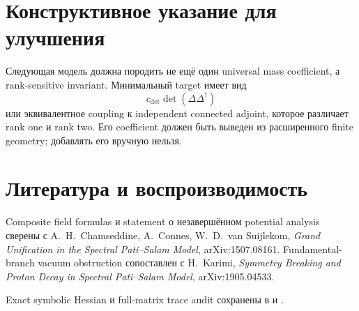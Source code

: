 \section{Конструктивное указание для улучшения}

Следующая модель должна породить не ещё один universal mass coefficient, а
rank-sensitive invariant. Минимальный target имеет вид
\begin{equation}
 c_{\det}\det(\Delta\Delta^\dagger)
\end{equation}
или эквивалентное coupling к independent connected adjoint, которое
различает rank one и rank two. Его coefficient должен быть выведен из
расширенного finite geometry; добавлять его вручную нельзя.

\section{Литература и воспроизводимость}

Composite field formulas и statement о незавершённом potential analysis
сверены с A.~H.~Chamseddine, A.~Connes, W.~D.~van Suijlekom,
\emph{Grand Unification in the Spectral Pati--Salam Model},
arXiv:1507.08161. Fundamental-branch vacuum obstruction сопоставлен с
H.~Karimi, \emph{Symmetry Breaking and Proton Decay in Spectral Pati--Salam
Model}, arXiv:1905.04533.

Exact symbolic Hessian и full-matrix trace audit сохранены в
 и
.